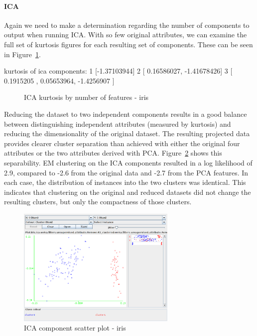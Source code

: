 \documentclass{sig-alternate}
\begin{document}
\paragraph{ICA}

Again we need to make a determination regarding the number of components to output when running ICA. With so few original attributes, we can examine the full set of kurtosis figures for each resulting set of components. These can be seen in Figure~\ref{ica-kurtosis-iris}.

\begin{verbbox}
kurtosis of ica components:
1   [-1.37103944]
2   [ 0.16586027, -1.41678426]
3   [ 0.1915205 ,  0.05653964, -1.4256907 ]
\end{verbbox}

\begin{figure}[!htbp]
    \centering
    \theverbbox
    \caption{ICA kurtosis by number of features - iris\label{ica-kurtosis-iris}}
\end{figure}

Reducing the dataset to two independent components results in a good balance between distinguishing independent attributes (measured by kurtosis) and reducing the dimensionality of the original dataset. The resulting projected data provides clearer cluster separation than achieved with either the original four attributes or the two attributes derived with PCA. Figure~\ref{ica-scatter-iris} shows this separability. EM clustering on the ICA components resulted in a log likelihood of 2.9, compared to -2.6 from the original data and -2.7 from the PCA features. In each case, the distribution of instances into the two clusters was identical. This indicates that clustering on the original and reduced datasets did not change the resulting clusters, but only the compactness of those clusters.


\begin{figure}[!htbp]
    \centering
    \includegraphics[width=3in]{part2/iris/ica-scatter.pdf}
    \caption{ICA component scatter plot - iris\label{ica-scatter-iris}}
\end{figure} 
\end{document}
